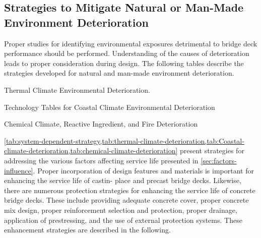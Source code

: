 \subsection{Strategies to Mitigate Natural or Man-Made Environment Deterioration}
\label{subsec:strategies-mitigate-hazard}
Proper studies for identifying environmental exposures detrimental to bridge deck performance should be performed. Understanding of the causes of deterioration leads to proper consideration during design.  The following tables describe the strategies developed for natural and man-made environment deterioration.
\begin{table}
  \caption{Thermal Climate Environmental Deterioration.}
  \label{tab:thermal-climate-deterioration}
\end{table}

\begin{table}
  \caption{Technology Tables for Coastal Climate Environmental Deterioration}
  \label{tab:Coastal-climate-deterioration}
\end{table}

\begin{table}
  \caption{Chemical Climate, Reactive Ingredient, and Fire Deterioration}
  \label{tab:chemical-climate-deterioration}
\end{table}

\cref{tab:system-dependent-strategy,tab:thermal-climate-deterioration,tab:Coastal-climate-deterioration,tab:chemical-climate-deterioration} present strategies for addressing the various factors affecting service life presented in \cref{sec:factors-influence}. Proper incorporation of design features and materials is important for enhancing the service life of castin- place and precast bridge decks. Likewise, there are numerous protection strategies for enhancing the service life of concrete bridge decks. These include providing adequate concrete cover, proper concrete mix design, proper reinforcement selection and protection, proper drainage, application of prestressing, and the use of external protection systems. These enhancement strategies are described in the following.

